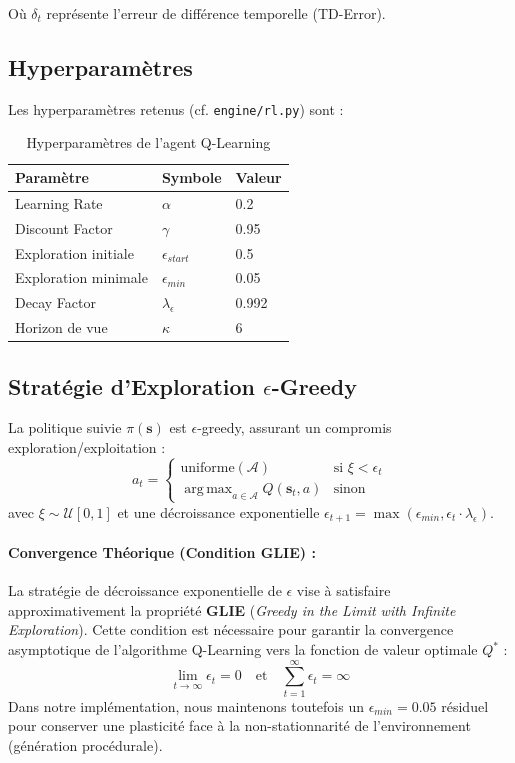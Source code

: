 \documentclass[12pt,a4paper]{article}
\newcommand{\state}{\mathbf{s}}
\newcommand{\action}{a}
\newcommand{\Qval}{Q}
\DeclareMathOperator*{\argmax}{arg\,max}
\begin{document}
Où $\delta_t$ représente l'erreur de différence temporelle (TD-Error).

\subsection{Hyperparamètres}
Les hyperparamètres retenus (cf. \texttt{engine/rl.py}) sont :

\begin{table}[H]
\centering
\begin{tabular}{@{}llp{7cm}@{}}
\toprule
\textbf{Paramètre} & \textbf{Symbole} & \textbf{Valeur} \\ \midrule
Learning Rate & $\alpha$ & 0.2 \\
Discount Factor & $\gamma$ & 0.95 \\
Exploration initiale & $\epsilon_{start}$ & 0.5 \\
Exploration minimale & $\epsilon_{min}$ & 0.05 \\
Decay Factor & $\lambda_{\epsilon}$ & 0.992 \\
Horizon de vue & $\kappa$ & 6 \\
\bottomrule
\end{tabular}
\caption{Hyperparamètres de l'agent Q-Learning}
\end{table}

\subsection{Stratégie d'Exploration $\epsilon$-Greedy}
La politique suivie $\pi(\state)$ est $\epsilon$-greedy, assurant un compromis exploration/exploitation :
\begin{equation}
    \action_t = \begin{cases} 
    \text{uniforme}(\mathcal{A}) & \text{si } \xi < \epsilon_t \\
    \argmax_{\action \in \mathcal{A}} \Qval(\state_t, \action) & \text{sinon}
    \end{cases}
\end{equation}
avec $\xi \sim \mathcal{U}[0,1]$ et une décroissance exponentielle $\epsilon_{t+1} = \max(\epsilon_{min}, \epsilon_t \cdot \lambda_{\epsilon})$.

\paragraph{Convergence Théorique (Condition GLIE) :}
La stratégie de décroissance exponentielle de $\epsilon$ vise à satisfaire approximativement la propriété \textbf{GLIE} (\textit{Greedy in the Limit with Infinite Exploration}). Cette condition est nécessaire pour garantir la convergence asymptotique de l'algorithme Q-Learning vers la fonction de valeur optimale $Q^*$ :
\begin{equation}
    \lim_{t \to \infty} \epsilon_t = 0 \quad \text{et} \quad \sum_{t=1}^{\infty} \epsilon_t = \infty
\end{equation}
Dans notre implémentation, nous maintenons toutefois un $\epsilon_{min} = 0.05$ résiduel pour conserver une plasticité face à la non-stationnarité de l'environnement (génération procédurale).
\end{document}
